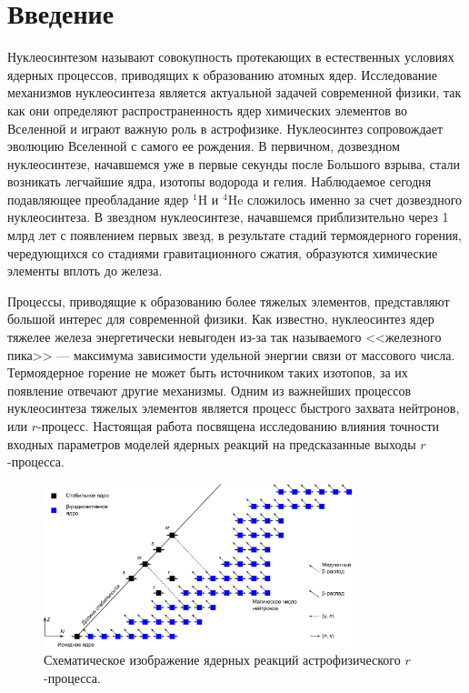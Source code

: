 \section{Введение}%
Нуклеосинтезом называют совокупность протекающих в естественных условиях ядерных процессов, приводящих к образованию атомных ядер. Исследование механизмов нуклеосинтеза является актуальной задачей современной физики, так как они определяют распространенность ядер химических элементов во Вселенной и играют важную роль в астрофизике. Нуклеосинтез сопровождает эволюцию Вселенной с самого ее рождения. В первичном, дозвездном нуклеосинтезе, начавшемся уже в первые секунды после Большого взрыва, стали возникать легчайшие ядра, изотопы водорода и гелия. Наблюдаемое сегодня подавляющее преобладание ядер ${}^1$H и ${}^4$He сложилось именно за счет дозвездного нуклеосинтеза. В звездном нуклеосинтезе, начавшемся приблизительно через 1 млрд лет с появлением первых звезд, в результате стадий термоядерного горения, чередующихся со стадиями гравитационного сжатия, образуются химические элементы вплоть до железа. 

Процессы, приводящие к образованию более тяжелых элементов, представляют большой интерес для современной физики. Как известно, нуклеосинтез ядер тяжелее железа энергетически невыгоден из-за так называемого <<железного пика>> --- максимума зависимости удельной энергии связи от массового числа. Термоядерное горение не может быть источником таких изотопов, за их появление отвечают другие механизмы. Одним из важнейших процессов нуклеосинтеза тяжелых элементов является процесс быстрого захвата нейтронов, или $r$-процесс. Настоящая работа посвящена исследованию влияния точности входных параметров моделей ядерных реакций на предсказанные выходы $r$-процесса.

\begin{figure}[!b]
  \centering
  \includegraphics[width=0.8\textwidth]{../pics/tracks.pdf}
  \caption{Схематическое изображение ядерных реакций астрофизического $r$-процесса.}
  \label{fig:tracks}
\end{figure}

